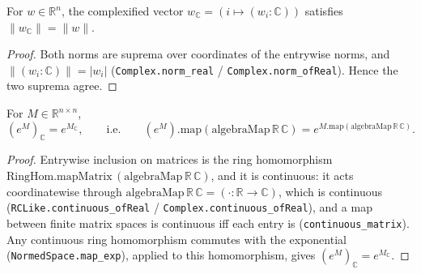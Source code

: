 \begin{lemma}
    \label{lem:norm_complexify_vec}
    \leanok
    For $w \in \mathbb{R}^{n}$, the complexified vector $w_{\mathbb{C}} = (i
    \mapsto (w_i : \mathbb{C}))$ satisfies $\|w_{\mathbb{C}}\| = \|w\|$.
\end{lemma}
\begin{proof}
    Both norms are suprema over coordinates of the entrywise norms, and
    $\|(w_i : \mathbb{C})\| = |w_i|$ (\texttt{Complex.norm\_real} /
    \texttt{Complex.norm\_ofReal}). Hence the two suprema agree.
\end{proof}

\begin{lemma}
    \label{lem:exp_map_complexify}
    \leanok
    For $M \in \mathbb{R}^{n \times n}$,
    \[ (e^{M})_{\mathbb{C}} = e^{M_{\mathbb{C}}}, \qquad\text{i.e.}\qquad
       (e^{M}).\mathrm{map}(\mathrm{algebraMap}\,\mathbb{R}\,\mathbb{C})
       = e^{M.\mathrm{map}(\mathrm{algebraMap}\,\mathbb{R}\,\mathbb{C})}. \]
\end{lemma}
\begin{proof}
    Entrywise inclusion on matrices is the ring homomorphism
    $\mathrm{RingHom.mapMatrix}\,(\mathrm{algebraMap}\,\mathbb{R}\,\mathbb{C})$,
    and it is continuous: it acts coordinatewise through
    $\mathrm{algebraMap}\,\mathbb{R}\,\mathbb{C} = (\cdot : \mathbb{R} \to
    \mathbb{C})$, which is continuous (\texttt{RCLike.continuous\_ofReal} /
    \texttt{Complex.continuous\_ofReal}), and a map between finite matrix spaces
    is continuous iff each entry is (\texttt{continuous\_matrix}). Any continuous
    ring homomorphism commutes with the exponential
    (\texttt{NormedSpace.map\_exp}), applied to this homomorphism, gives
    $(e^{M})_{\mathbb{C}} = e^{M_{\mathbb{C}}}$.
\end{proof}

